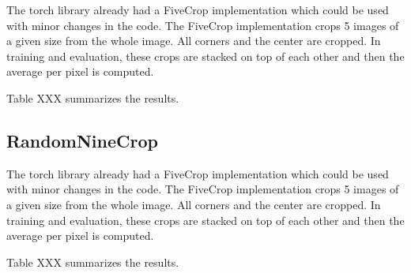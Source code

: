 The torch library already had a FiveCrop implementation which could be used with minor changes in the code. The FiveCrop implementation crops 5 images of a given size from the whole image. All corners and the center are cropped. In training and evaluation, these crops are stacked on top of each other and then the average per pixel is computed.

Table XXX summarizes the results.

\begin{table}[h] \centering
{}
\caption{Resnet18 FiveCrop Implementation with and without pre-training. FINAL (regular) means ResNet18 with the resizing of the image instead of cropping and averaging}
\label{tbl:resnet18-fivecrop}
\end{table}

\subsection{RandomNineCrop}

The torch library already had a FiveCrop implementation which could be used with minor changes in the code. The FiveCrop implementation crops 5 images of a given size from the whole image. All corners and the center are cropped. In training and evaluation, these crops are stacked on top of each other and then the average per pixel is computed.

Table XXX summarizes the results.

\begin{table}[h] \centering
{}
\caption{Resnet18 FiveCrop Implementation with and without pre-training. FINAL (regular) means ResNet18 with the resizing of the image instead of cropping and averaging}
\label{tbl:resnet18-randomnine}
\end{table}








